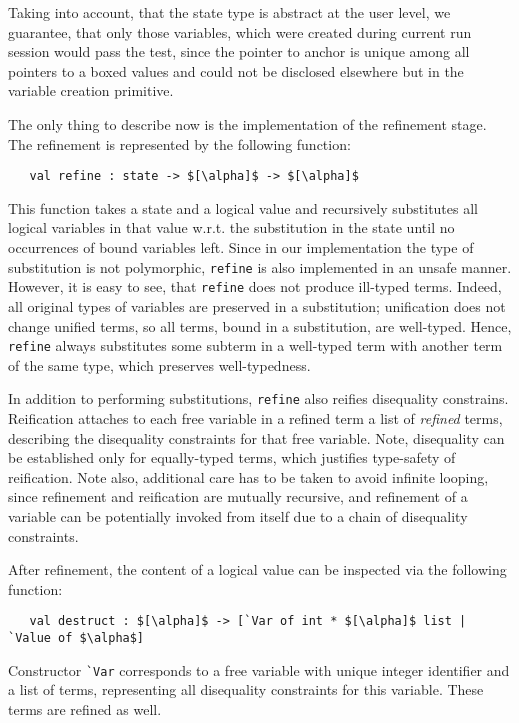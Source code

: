 Taking into account, that the state type is abstract at the user level, we guarantee, that only those variables, which were
created during current run session would pass the test, since the pointer to anchor is unique among all pointers to a boxed values 
and could not be disclosed elsewhere but in the variable creation primitive.

The only thing to describe now is the implementation of the refinement stage. The refinement is represented by the following 
function:

\begin{lstlisting}
   val refine : state -> $[\alpha]$ -> $[\alpha]$ 
\end{lstlisting}

This function takes a state and a logical value and recursively substitutes all logical variables in that value w.r.t. 
the substitution in the state until no occurrences of bound variables left. Since in our implementation the type of substitution is
not polymorphic, \lstinline{refine} is also implemented in an unsafe manner. However, it is easy to see, that \lstinline{refine} 
does not produce ill-typed terms. Indeed, all original types of variables are preserved in a substitution; unification does not 
change unified terms, so all terms, bound in a substitution, are well-typed. Hence, \lstinline{refine} always substitutes
some subterm in a well-typed term with another term of the same type, which preserves well-typedness.

In addition to performing substitutions, \lstinline{refine} also reifies disequality constrains. Reification 
attaches to each free variable in a refined term a list of \emph{refined} terms, describing the disequality constraints for that
free variable. Note, disequality can be established only for equally-typed terms, which justifies type-safety of reification. 
Note also, additional care has to be taken to avoid infinite looping, since refinement and reification are
mutually recursive, and refinement of a variable can be potentially invoked from itself due to a chain of disequality 
constraints.

After refinement, the content of a logical value can be inspected via the following function:

\begin{lstlisting}
   val destruct : $[\alpha]$ -> [`Var of int * $[\alpha]$ list | `Value of $\alpha$]
\end{lstlisting}

Constructor \lstinline{`Var} corresponds to a free variable with unique integer identifier and a list of terms, 
representing all disequality constraints for this variable. These terms are refined as well.

